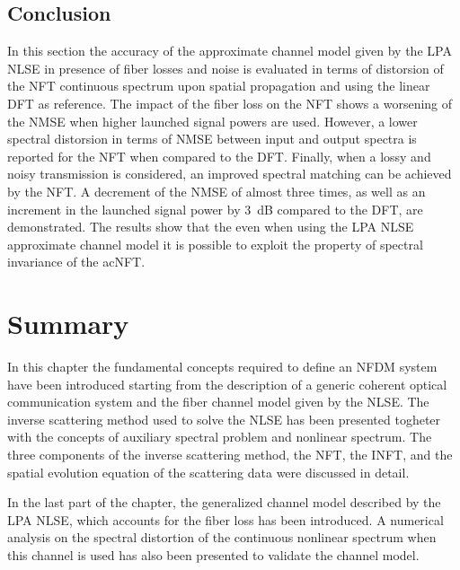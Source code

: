 \subsection{Conclusion}
%
In this section the accuracy of the approximate channel model given by the \ac{LPA} \ac{NLSE} in presence of fiber losses and noise is evaluated  in terms of distorsion of the \ac{NFT} continuous spectrum upon spatial propagation and using the linear \ac{DFT} as reference.
The impact of the fiber loss on the \ac{NFT} shows a
worsening of the \ac{NMSE} when higher launched signal powers are used.
However, a lower spectral distorsion in terms of \ac{NMSE} between
input and output spectra is reported for the \ac{NFT} when
compared to the \ac{DFT}. Finally, when a lossy and noisy transmission is
considered, an improved spectral matching can be achieved by the \ac{NFT}. A
decrement of the \ac{NMSE} of almost three times, as well as an increment in the launched signal
power by \SI{3}{\dB} compared to the \ac{DFT}, are demonstrated. The results show that the even when using the \ac{LPA} \ac{NLSE} approximate channel model it is possible to exploit the property of spectral invariance of the ac{NFT}.

%

\section{Summary}
In this chapter the fundamental concepts required to define an \ac{NFDM}
system have been introduced starting from the description of a generic coherent
optical communication system and the fiber channel model given by the \ac{NLSE}. The inverse scattering method used to solve the \ac{NLSE} has been presented togheter with the concepts of auxiliary spectral problem and nonlinear spectrum. The three components of the inverse scattering method, the \ac{NFT}, the \ac{INFT}, and the spatial evolution equation of the scattering data were discussed in detail.

In the last part of the chapter, the generalized channel model described by the \ac{LPA} \ac{NLSE}, which accounts for the fiber loss has been introduced. A numerical analysis on the spectral
distortion of the continuous nonlinear spectrum when this channel is used has also been presented to validate the channel model.


